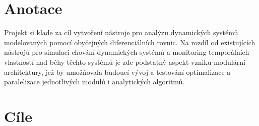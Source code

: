 \documentclass[a4paper]{article}
\begin{document}
\doublespacing

\section{Anotace}
Projekt si klade za cíl vytvoření nástroje pro analýzu dynamických systémů modelovaných pomocí obyčejných diferenciálních rovnic. Na rozdíl od existujících
nástrojů pro simulaci chování dynamických systémů a monitoring temporálních vlastností nad běhy těchto systémů je zde podstatný aspekt vzniku modulární
architektury, jež by umožňovala budoucí vývoj a testování optimalizace a paralelizace jednotlivých modulů i analytických algoritmů.

\section{Cíle}
\end{document}
